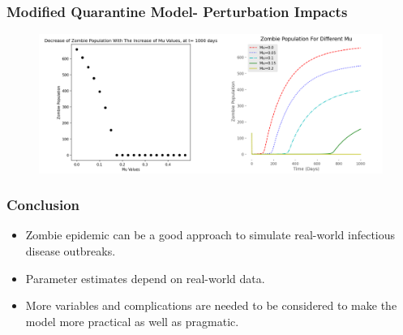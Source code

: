 \documentclass{beamer}
\begin{document}
\begin{frame}
\begin{adjustwidth}{-1.7em}{-1.5em}
\frametitle{Modified Quarantine Model- Perturbation Impacts}

\begin{figure}[H]
\centering
\includegraphics[scale=0.39]{SEZQR_2.png}
\label{fig:SEZQR Model 04}
\end{figure}
\end{adjustwidth}
\end{frame}



\begin{frame}
\frametitle{Conclusion}

\begin{itemize}
	\item Zombie epidemic can be a good approach to simulate real-world infectious disease outbreaks.
	
	\item Parameter estimates depend on real-world data.
	
	\item More variables and complications are needed to be considered to make the model more practical as well as pragmatic.
\end{itemize}
\end{frame}
\end{document}
